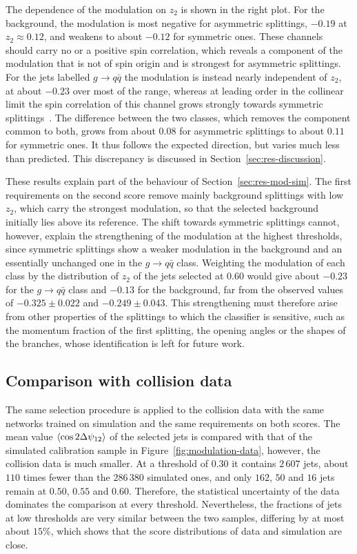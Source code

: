 The dependence of the modulation on $z_2$ is shown in the right plot. For the background,
the modulation is most negative for asymmetric
splittings, $-0.19$ at $z_2 \approx 0.12$, and weakens to about $-0.12$ for
symmetric ones. These channels should carry no or a positive spin correlation, 
which reveals a component of the modulation that is not of spin
origin and is strongest for asymmetric splittings. For the jets labelled
$g \to q\bar{q}$ the modulation is instead nearly independent of $z_2$, at about
$-0.23$ over most of the range, whereas at leading order in the collinear limit
the spin correlation of this channel grows strongly towards symmetric
splittings~\cite{Karlberg_2021}. The difference between the two classes, which
removes the component common to both, grows from about $0.08$ for asymmetric
splittings to about $0.11$ for symmetric ones. It thus follows the expected
direction, but varies much less than predicted. This discrepancy is discussed in
Section~\ref{sec:res-discussion}.

These results explain part of the behaviour of Section~\ref{sec:res-mod-sim}. The
first requirements on the second score remove mainly background splittings with
low $z_2$, which carry the strongest modulation, so that the selected background
initially lies above its reference. The shift towards symmetric splittings cannot,
however, explain the strengthening of the modulation at the highest thresholds,
since symmetric splittings show a weaker modulation in the background and an
essentially unchanged one in the $g \to q\bar{q}$ class. Weighting the modulation
of each class by the distribution of $z_2$ of the jets selected at $0.60$ would
give about $-0.23$ for the $g \to q\bar{q}$ class and $-0.13$ for the background,
far from the observed values of $-0.325 \pm 0.022$ and $-0.249 \pm 0.043$. This
strengthening must therefore arise from other properties of the splittings to
which the classifier is sensitive, such as the momentum fraction of the first
splitting, the opening angles or the shapes of the branches, whose identification
is left for future work.

\subsection{Comparison with collision data}
\label{sec:res-mod-data}

The same selection procedure is applied to the collision data with the same networks
trained on simulation and the same requirements on both scores. The mean value
$\langle \cos 2\Delta\psi_{12} \rangle$ of the selected jets is compared with that of the
simulated calibration sample in Figure~\ref{fig:modulation-data}, however, 
the collision data is much smaller. At a threshold of $0.30$ it contains $2\,607$ jets, about $110$
times fewer than the $286\,380$ simulated ones, and only $162$, $50$ and $16$ jets
remain at $0.50$, $0.55$ and $0.60$. Therefore, the statistical uncertainty
of the data dominates the comparison at every threshold. Nevertheless,
the fractions of jets at low thresholds are very similar between the two samples, differing by at most about $15\%$, 
which shows that the score distributions of data and simulation are close.

